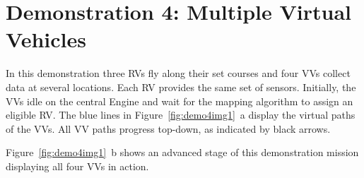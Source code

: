 \section{Demonstration 4: Multiple Virtual Vehicles}
In this demonstration three \acp{RV} fly along their set courses and four \acp{VV} collect data at several locations.
Each \ac{RV} provides the same set of sensors. Initially, the \acp{VV} idle on the central Engine and wait for
the mapping algorithm to assign an eligible \ac{RV}.  
%
The blue lines in Figure~\ref{fig:demo4img1}~a display the virtual paths of the \acp{VV}.
All \ac{VV} paths progress top-down, as indicated by black arrows.

Figure~\ref{fig:demo4img1}~b shows an advanced stage of this demonstration mission displaying all four \acp{VV} in
action.
%
